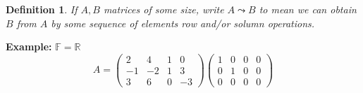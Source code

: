 \documentclass[12pt]{article}
\theoremstyle{plain}
\newtheorem{definition}{Definition}[subsection]
\newcommand{\mR}{{\mathbb{R}}}
\newcommand{\mF}{{\mathbb{F}}}
\begin{document}
	\begin{definition}
		If $A, B$ matrices of some size, write $A \leadsto B$ to mean we can
		obtain $B$ from $A$ by some sequence of elements row and/or solumn 
		operations. 
	\end{definition}

	{\color{Brown}
	\textbf{Example: } $\mF= \mR$
	\[
		A = 
		\begin{pmatrix}
			2	& 4	& 1 & 0\\
			-1	& -2& 1 & 3\\
			3 & 6 & 0 & -3 
		\end{pmatrix}
		\begin{pmatrix}
			1 & 0 & 0 & 0\\
			0 & 1 & 0 & 0\\
			0 & 0 & 0 & 0
		\end{pmatrix}
	\]
	
}
\end{document}
